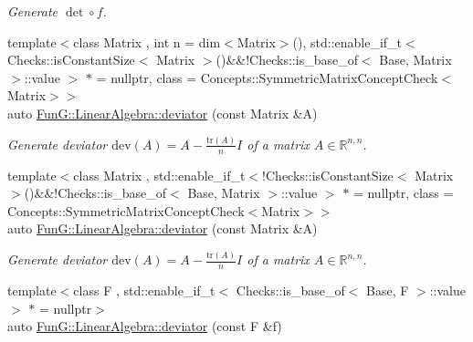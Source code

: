 \begin{DoxyCompactItemize}
\begin{DoxyCompactList}\small\item\em Generate $\det\circ f$. \end{DoxyCompactList}\item 
\hypertarget{group__LinearAlgebraGroup_ga7c0b1db93cfc5779a3b1e7eb1646c213}{{\footnotesize template$<$class Matrix , int n = dim$<$\-Matrix$>$(), std\-::enable\-\_\-if\-\_\-t$<$ Checks\-::is\-Constant\-Size$<$ Matrix $>$()\&\&!\-Checks\-::is\-\_\-base\-\_\-of$<$ Base, Matrix $>$\-::value $>$ $\ast$  = nullptr, class  = Concepts\-::\-Symmetric\-Matrix\-Concept\-Check$<$\-Matrix$>$$>$ }\\auto \hyperlink{group__LinearAlgebraGroup_ga7c0b1db93cfc5779a3b1e7eb1646c213}{Fun\-G\-::\-Linear\-Algebra\-::deviator} (const Matrix \&A)}\label{group__LinearAlgebraGroup_ga7c0b1db93cfc5779a3b1e7eb1646c213}

\begin{DoxyCompactList}\small\item\em Generate deviator $ \mathrm{dev}(A) = A - \frac{\mathrm{tr}(A)}{n}I $ of a matrix $ A\in\mathbb{R}^{n,n} $. \end{DoxyCompactList}\item 
\hypertarget{group__LinearAlgebraGroup_gabc90de0d1754cd2e2d190ea8ba62245f}{{\footnotesize template$<$class Matrix , std\-::enable\-\_\-if\-\_\-t$<$!\-Checks\-::is\-Constant\-Size$<$ Matrix $>$()\&\&!\-Checks\-::is\-\_\-base\-\_\-of$<$ Base, Matrix $>$\-::value $>$ $\ast$  = nullptr, class  = Concepts\-::\-Symmetric\-Matrix\-Concept\-Check$<$\-Matrix$>$$>$ }\\auto \hyperlink{group__LinearAlgebraGroup_gabc90de0d1754cd2e2d190ea8ba62245f}{Fun\-G\-::\-Linear\-Algebra\-::deviator} (const Matrix \&A)}\label{group__LinearAlgebraGroup_gabc90de0d1754cd2e2d190ea8ba62245f}

\begin{DoxyCompactList}\small\item\em Generate deviator $ \mathrm{dev}(A) = A - \frac{\mathrm{tr}(A)}{n}I $ of a matrix $ A\in\mathbb{R}^{n,n} $. \end{DoxyCompactList}\item 
\hypertarget{group__LinearAlgebraGroup_gad363f3add577abc046fc525ce83e22d3}{{\footnotesize template$<$class F , std\-::enable\-\_\-if\-\_\-t$<$ Checks\-::is\-\_\-base\-\_\-of$<$ Base, F $>$\-::value $>$ $\ast$  = nullptr$>$ }\\auto \hyperlink{group__LinearAlgebraGroup_gad363f3add577abc046fc525ce83e22d3}{Fun\-G\-::\-Linear\-Algebra\-::deviator} (const F \&f)}\label{group__LinearAlgebraGroup_gad363f3add577abc046fc525ce83e22d3}


\end{DoxyCompactItemize}
